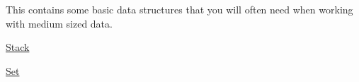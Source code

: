 This contains some basic data structures that you will often need when working with medium sized data.


\begin{DoxyItemize}
\item \mbox{\hyperlink{Stack}{Stack}}
\item \mbox{\hyperlink{Set}{Set}} 
\end{DoxyItemize}
